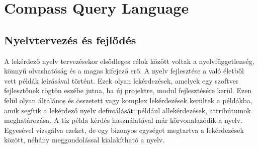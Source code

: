 \documentclass[a4paper,12pt]{report}
\begin{document}
\chapter{Compass Query Language}
\section{Nyelvtervezés és fejlődés}
A lekérdező nyelv tervezésekor elsődleges célok között voltak a nyelvfüggetlenség, könnyű olvashatóság és a magas kifejező erő. A nyelv fejlesztése a való életből vett példák leírásával történt. Ezek olyan lekérdezések, amelyek egy szoftver fejlesztőnek rögtön eszébe jutna, ha új projektre, modul fejlesztésére kerül. Ezen felül olyan általános és összetett vagy komplex lekérdezések kerültek a példákba, amik segítik a lekérdező nyelv definiálását: például allekérdezések, attribútumok meghatározása. A tíz példa kérdés használatával már körvonalazódik a nyelv. Egyesével vizsgálva ezeket, de egy bizonyos egységet megtartva a lekérdezések között, néhány meggondolással kialakítható a nyelv.
\end{document}
